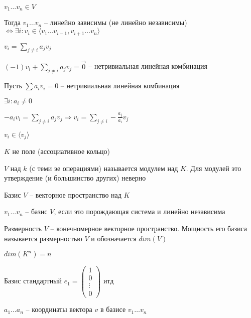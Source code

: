 \documentclass[12pt]{article}
\newcommand{\q}[1]{\langle #1 \rangle}
\begin{document}
\begin{propos}{}
    $v_1 \ldots v_n \in V$

    Тогда $v_1 \ldots v_n$ -- линейно зависимы (не линейно независимы) $\Leftrightarrow \exists i : v_i \in \q{v_1 \ldots v_{i - 1}, v_{i + 1} \ldots v_n}$

    $v_i = \sum\limits_{j \neq i} a_jv_j$

    $(-1)v_i + \sum\limits_{j \neq i} a_jv_j = \overrightarrow{0}$ -- нетривиальная линейная комбинация 

    \vspace{2mm}

    Пусть $\sum a_iv_i = 0$ -- нетривиальная линейная комбинация

    $\exists i : a_i \neq 0$

    $-a_iv_i = \sum\limits_{j \neq i} a_jv_j \Rightarrow v_i = \sum\limits_{j \neq i} -\frac{a_j}{a_i}v_j$

$v_i \in \q{v_j}$
\end{propos}

\begin{Remark}{}
    $K$ не поле (ассоциативное кольцо)

    $V$ над $k$ (с теми эе операциями) называется модулем над $K$. Для модулей это утверждение (и большинство других) неверно
\end{Remark}

\begin{defin}{Базис}
    $V$ -- векторное пространство над $K$

    $v_1 \ldots v_n$ -- базис $V$, если это порождающая система и линейно независима
\end{defin}

\begin{defin}{Размерность}
    $V$ -- конечномерное векторное пространство. Мощность его базиса называется размерностью $V$ и обозначается $dim(V)$
\end{defin}

\begin{Example}{}
    $dim(K^n) = n$

    Базис стандартный $e_1 = \left( \begin{gathered}
        1 \\
        0 \\
        \vdots \\
        0
    \end{gathered} \right)$ итд
\end{Example}

\begin{defin}{}
    $a_1 \ldots a_n$ -- координаты вектора $v$ в базисе $v_1 \ldots v_n$
\end{defin}
\end{document}

